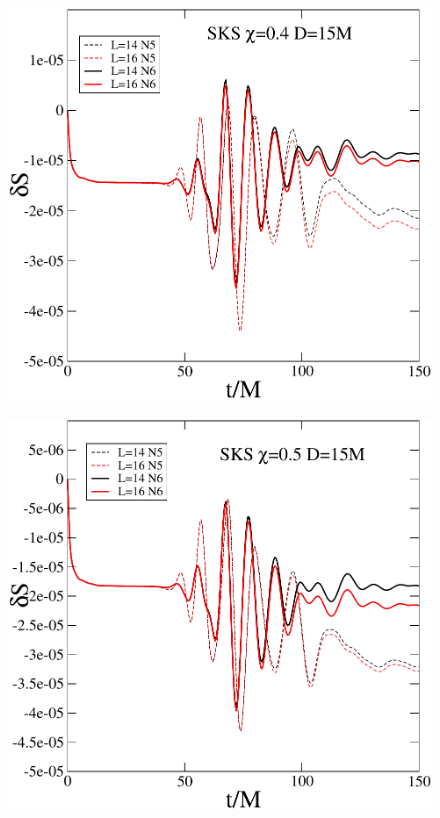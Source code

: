 \documentclass[aps,prd,amsmath,floatfix,twocolumn,superscriptaddress,nofootinbib,showpacs]{revtex4-1}
\theoremstyle{plain}
\theoremstyle{definition}
\begin{document}
\begin{figure}
  \includegraphics[width=0.99\columnwidth]{dS_SKS_S4}
\end{figure}

\begin{figure}
  \includegraphics[width=0.99\columnwidth]{dS_SKS_S5}
\end{figure}
\end{document}
